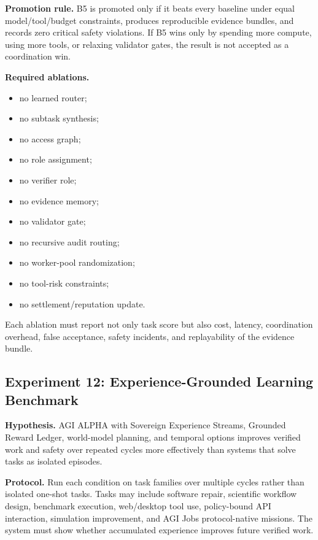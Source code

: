 \textbf{Promotion rule.} B5 is promoted only if it beats every baseline
under equal model/tool/budget constraints, produces reproducible
evidence bundles, and records zero critical safety violations. If B5
wins only by spending more compute, using more tools, or relaxing
validator gates, the result is not accepted as a coordination win.

\textbf{Required ablations.}

\begin{itemize}
\tightlist
\item
  no learned router;
\item
  no subtask synthesis;
\item
  no access graph;
\item
  no role assignment;
\item
  no verifier role;
\item
  no evidence memory;
\item
  no validator gate;
\item
  no recursive audit routing;
\item
  no worker-pool randomization;
\item
  no tool-risk constraints;
\item
  no settlement/reputation update.
\end{itemize}

Each ablation must report not only task score but also cost, latency,
coordination overhead, false acceptance, safety incidents, and
replayability of the evidence bundle.

\subsection{Experiment 12: Experience-Grounded Learning
Benchmark}\label{experiment-12-experience-grounded-learning-benchmark}

\textbf{Hypothesis.} AGI ALPHA with Sovereign Experience Streams,
Grounded Reward Ledger, world-model planning, and temporal options
improves verified work and safety over repeated cycles more effectively
than systems that solve tasks as isolated episodes.

\textbf{Protocol.} Run each condition on task families over multiple
cycles rather than isolated one-shot tasks. Tasks may include software
repair, scientific workflow design, benchmark execution, web/desktop
tool use, policy-bound API interaction, simulation improvement, and AGI
Jobs protocol-native missions. The system must show whether accumulated
experience improves future verified work.

